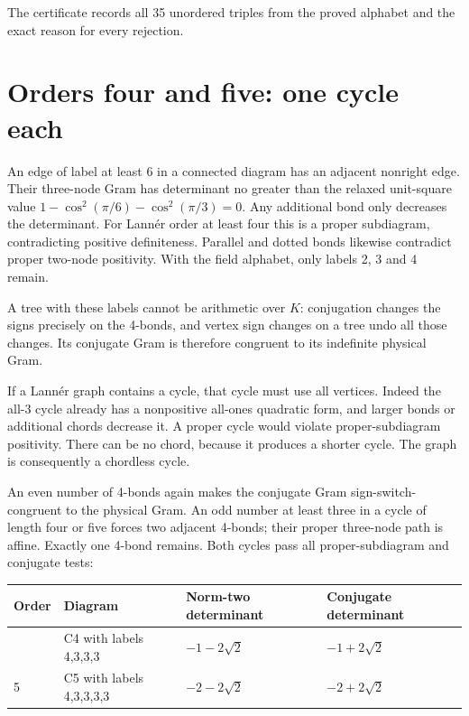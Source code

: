 \documentclass[
  10pt,
]{report}
\newcounter{none} %
\begin{document}
The certificate records all 35 unordered triples from the proved
alphabet and the exact reason for every rejection.

\section{Orders four and five: one cycle
each}\label{orders-four-and-five-one-cycle-each}

An edge of label at least 6 in a connected diagram has an adjacent
nonright edge. Their three-node Gram has determinant no greater than the
relaxed unit-square value \(1-\cos^2(\pi/6)-\cos^2(\pi/3)=0\). Any
additional bond only decreases the determinant. For Lannér order at
least four this is a proper subdiagram, contradicting positive
definiteness. Parallel and dotted bonds likewise contradict proper
two-node positivity. With the field alphabet, only labels 2, 3 and 4
remain.

A tree with these labels cannot be arithmetic over \(K\): conjugation
changes the signs precisely on the 4-bonds, and vertex sign changes on a
tree undo all those changes. Its conjugate Gram is therefore congruent
to its indefinite physical Gram.

If a Lannér graph contains a cycle, that cycle must use all vertices.
Indeed the all-3 cycle already has a nonpositive all-ones quadratic
form, and larger bonds or additional chords decrease it. A proper cycle
would violate proper-subdiagram positivity. There can be no chord,
because it produces a shorter cycle. The graph is consequently a
chordless cycle.

An even number of 4-bonds again makes the conjugate Gram
sign-switch-congruent to the physical Gram. An odd number at least three
in a cycle of length four or five forces two adjacent 4-bonds; their
proper three-node path is affine. Exactly one 4-bond remains. Both
cycles pass all proper-subdiagram and conjugate tests:

{\def\LTcaptype{none} %
\begin{longtable}[]{@{}llll@{}}
\toprule\noalign{}
Order & Diagram & Norm-two determinant & Conjugate determinant \\
\midrule\noalign{}
\endhead
\bottomrule\noalign{}
\endlastfoot
4 & C4 with labels 4,3,3,3 & \(-1-2\sqrt2\) & \(-1+2\sqrt2\) \\
5 & C5 with labels 4,3,3,3,3 & \(-2-2\sqrt2\) & \(-2+2\sqrt2\) \\
\end{longtable}
}
\end{document}
